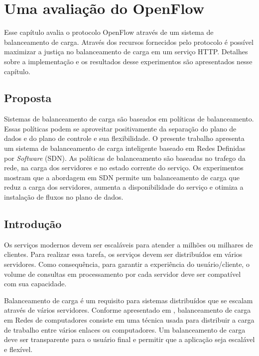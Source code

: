 \chapter{Uma avaliação do OpenFlow}

Esse capítulo avalia o protocolo OpenFlow através de um sistema de
balanceamento de carga.
Através dos recursos fornecidos pelo protocolo é possível maximizar a justiça
no balanceamento de carga em um serviço HTTP.
Detalhes sobre a implementação e os resultados desse experimentos são 
apresentados nesse capítulo.

\section{Proposta}

Sistemas de balanceamento de carga são baseados em políticas de balanceamento.
Essas políticas podem se aproveitar positivamente da separação do plano de 
dados e do plano de controle e sua flexibilidade.
O presente trabalho apresenta um sistema de balanceamento de carga inteligente
baseado em Redes Definidas por \emph{Software} (SDN).
As políticas de balanceamento são baseadas no trafego da rede, na carga dos 
servidores e no estado corrente do serviço.
Os experimentos mostram que a abordagem em SDN permite um balanceamento de carga
que reduz a carga dos servidores, aumenta a disponibilidade do serviço e 
otimiza a instalação de fluxos no plano de dados.

\section{Introdução}

Os serviços modernos devem ser escaláveis para atender a milhões ou milhares
de clientes.
Para realizar essa tarefa, os serviços devem ser distribuídos em vários
servidores. 
Como consequência, para garantir a experiência do usuário/cliente, o volume
de consultas em processamento por cada servidor deve ser compatível com 
sua capacidade.

Balanceamento de carga é um requisito para sistemas distribuídos que se 
escalam através de vários servidores.
Conforme apresentado em \citep{hardeep2010openflow}, balanceamento de carga
em Redes de computadores consiste em uma técnica usada para distribuir a 
carga de trabalho entre vários enlaces ou computadores.
Um balanceamento de carga deve ser transparente para o usuário final e 
permitir que a aplicação seja escalável e flexível.

